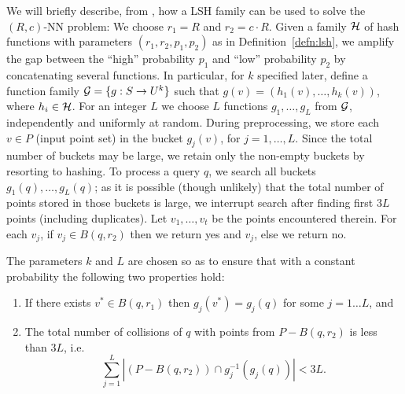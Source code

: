 \documentclass[12pt]{article}
\begin{document}
We will briefly describe, from \cite{IM}, how a LSH family can be used to
solve the $(R,c)$-NN problem: We choose $r_1=R$ and $r_2=c \cdot R$.
Given a family ${\cal H}$ of hash functions with parameters
$(r_1,r_2,p_1,p_2)$ as in Definition~\ref{defn:lsh}, we
amplify the gap between the ``high'' probability $p_1$ and ``low''
probability $p_2$ by concatenating several functions.  In particular, for
$k$ specified later, define a function family ${\cal G} = \{g:S \to U^k\}$
such that $g(v)=(h_1(v), \ldots ,h_k(v))$, where $h_i \in {\cal H}$. For
an integer $L$ we choose $L$ functions $g_1, \ldots, g_L$ from ${\cal G}$,
independently and uniformly at random.  During preprocessing, we store
each $v \in P$ (input point set) in the bucket $g_j(v)$, for $j=1, \ldots,
L$. Since the total number of buckets may be large, we retain only the
non-empty buckets by resorting to hashing.
To process a query $q$, we search all buckets $g_1(q), \ldots, g_L(q)$; as
it is possible (though unlikely) that the total number of points stored in
those buckets is large, we interrupt search after finding first $3L$ points
(including duplicates).  Let $v_1, \ldots, v_t$ be the points encountered
therein.
For each $v_j$, if $v_j \in B(q,r_2)$ then we return {\sc yes} and $v_j$,
else we return {\sc no}.

The parameters $k$ and $L$ are chosen so as to ensure that with a constant probability the following two properties hold:
\begin{enumerate}
\item If there exists $v^* \in B(q,r_1)$ then $g_j(v^*)=g_j(q)$ for some $j=1 \ldots L$, and
\item The total number of collisions of $q$ with points from $P - B(q,r_2)$ is less than $3L$, i.e.
\[ \sum_{j=1}^L |(P-B(q,r_2)) \cap g_j^{-1}(g_j(q))| < 3L.\]
\end{enumerate}
\end{document}
